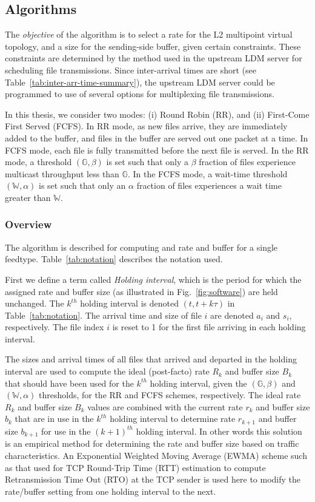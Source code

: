 \subsection{Algorithms}
\label{sec:algorithm}
The \emph{objective} of the algorithm is to select a rate for the L2 multipoint virtual topology, and a size for the sending-side
buffer, given certain constraints. These constraints are
determined by the method used in the upstream LDM server for
scheduling file transmissions. Since inter-arrival times are short
(see Table~\ref{tab:inter-arr-time-summary}), the upstream LDM
server could be programmed to use of several options for  multiplexing
file transmissions.

In this thesis, we consider two modes: (i) Round Robin (RR), and
(ii) First-Come First Served (FCFS). In RR mode, as new files
arrive, they are immediately added to the buffer, and files in the
buffer are served out one packet at a time.
In FCFS mode, each file is fully transmitted before the next file is served.
In the RR mode, a threshold
$(\mathbb{G},\beta)$ is set such that only
a $\beta$ fraction of files experience multicast throughput less than $\mathbb{G}$.
In the FCFS mode, a wait-time threshold $(\mathbb{W},\alpha)$ is set such that only an $\alpha$ fraction of files experiences a wait time greater than $\mathbb{W}$.

\subsubsection{Overview}

The algorithm
is described for computing and rate and buffer for a single feedtype.
Table~\ref{tab:notation} describes the notation used.


First we define a term called \emph{Holding interval}, which is the
period for which the assigned rate and buffer size (as illustrated in
Fig.~\ref{fig:software}) are held unchanged. The $k^{th}$ holding interval is
denoted $(t,t+k\tau)$ in Table~\ref{tab:notation}. The arrival time and
size of file $i$ are denoted $a_i$ and $s_i$, respectively. The file index $i$ is reset to 1 for the first file arriving in each holding interval.

The sizes and arrival times
of all files that arrived and departed in the holding interval are used
to compute the ideal (post-facto) rate $R_k$ and buffer size $B_k$ that should have been used for the $k^{th}$ holding interval, given
the $(\mathbb{G},\beta)$ and $(\mathbb{W},\alpha)$
thresholds, for the RR and FCFS schemes, respectively. The
ideal rate $R_k$ and buffer size $B_k$ values are combined with the current
rate $r_k$ and buffer size $b_k$ that are in use in the $k^{th}$ holding interval to determine rate $r_{k+1}$ and buffer size $b_{k+1}$
for use in the $(k+1)^{th}$ holding interval.
In other words this solution is an empirical method
for determining the rate and buffer size based on traffic characteristics. An Exponential Weighted
Moving Average (EWMA) scheme such as that used for TCP Round-Trip Time (RTT) estimation to compute Retransmission Time Out (RTO) at the TCP sender is used here to modify the rate/buffer setting from one holding
interval to the next.

